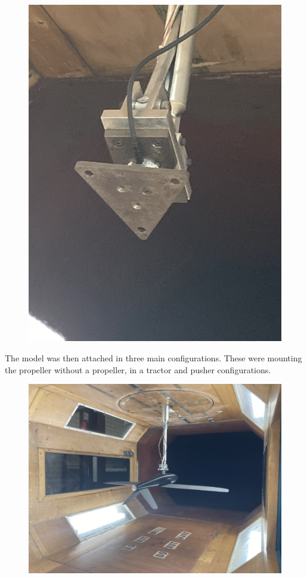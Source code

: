 \begin{figure}
    \centering
    \includegraphics[scale=0.75]{04_Methodology/Figs/mount}
    \label{fig:LoadCellb}
\end{figure}

The model was then attached in three main configurations. These were mounting the propeller without a propeller, in a tractor and pusher configurations.

\begin{figure}
    \centering
    \includegraphics[]{04_Methodology/Figs/noprop}
    \label{fig:noprop}
\end{figure}

